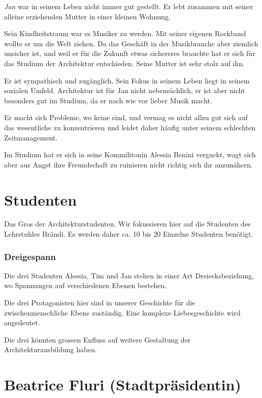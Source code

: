 \documentclass[11pt,a4paper,ngerman]{scrreprt}
\begin{document}
\emph{Jan} war in seinem Leben nicht immer gut gestellt. Er lebt zusammen mit seiner
alleine erziehenden Mutter in einer kleinen Wohnung.

Sein Kindheitstraum war es Musiker zu werden. Mit seiner eigenen Rockband wollte
er um die Welt ziehen. Da das Geschäft in der Musikbranche aber ziemlich
unsicher ist, und weil er für die Zukunft etwas sichereres brauchte hat er sich
für das Studium der Architektur entschieden. Seine Mutter ist sehr stolz auf
ihn.

Er ist sympathisch und zugänglich. Sein Fokus in seinem Leben liegt in seinem
sozialen Umfeld. Architektur ist für Jan nicht nebensächlich, er ist aber nicht
besonders gut im Studium, da er nach wie vor lieber Musik macht.

Er macht sich Probleme, wo keine sind, und vermag es nicht allzu gut sich auf
das wesentliche zu konzentrieren und leidet daher häufig unter seinem schlechten
Zeitmanagement.

Im Studium hat er sich in seine Kommilitonin Alessia Benini verguckt, wagt sich
aber aus Angst ihre Freundschaft zu ruinieren nicht richtig sich ihr anzunähern.

\section*{Studenten}

Das Gros der Architekturstudenten. Wir fokussieren hier auf die Studenten des
Lehrstuhles Brändi. Es werden daher ca. 10 bis 20 Einzelne Studenten benötigt.

\subsubsection*{Dreigespann}

Die drei Studenten Alessia, Tim und Jan stehen in einer Art Dreiecksbeziehung,
wo Spannungen auf verschiedenen Ebenen bestehen.

Die drei Protagonisten hier sind in unserer Geschichte für die
zwischenmenschliche Ebene zuständig. Eine komplexe Liebesgeschichte wird
angedeutet.

Die drei könnten grossen Enfluss auf weitere Gestaltung der
Architekturausbildung haben.

\section*{Beatrice Fluri (Stadtpräsidentin)}
\end{document}
